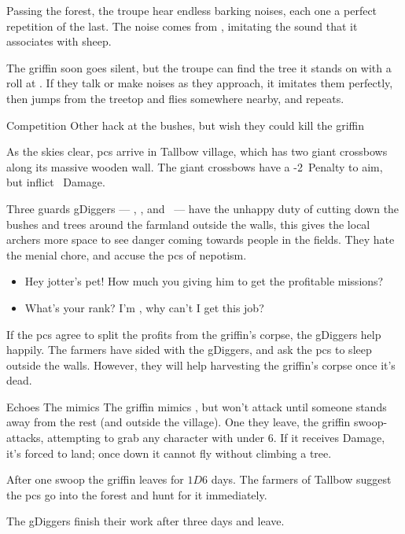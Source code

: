 \documentclass[10pt,twoside]{book}
\begin{document}
Passing the forest, the troupe hear endless barking noises, each one a perfect repetition of the last.
The noise comes from , imitating the sound that it associates with sheep.

The \gls{griffin} soon goes silent, but the troupe can find the tree it stands on with a  roll at \tn[8].
If they talk or make noises as they approach, it imitates them perfectly, then jumps from the treetop and flies somewhere nearby, and repeats.

{Competition}%
{Other  hack at the bushes, but wish they could kill the \gls{griffin}}%

As the skies clear, \glspl{pc} arrive in Tallbow \gls{village}, which has two giant \glspl{crossbow} along its massive wooden wall.
The giant \glspl{crossbow} have a -2~Penalty to aim, but inflict ~Damage.

Three \glspl{guard} \glspl{gDigger} --- \composeHumanName, \composeHumanName, and \composeHumanName\ --- have the unhappy duty of cutting down the bushes and trees around the farmland outside the walls, this gives the local archers more space to see danger coming towards people in the fields.
They hate the menial chore, and accuse the \glspl{pc} of nepotism.

\begin{itemize}\it
  \item
  Hey \gls{jotter}'s pet!
  How much you giving him to get the profitable missions?
  \item
  What's your rank?
  I'm , why can't I get this job?
\end{itemize}

If the \glspl{pc} agree to split the profits from the \gls{griffin}'s corpse, the \glspl{gDigger} help happily.
The farmers have sided with the \glspl{gDigger}, and ask the \glspl{pc} to sleep outside the walls.
However, they will help \gls{harvesting} the \gls{griffin}'s corpse once it's dead.


{Echoes}%
{The  mimics }%
The \gls{griffin} mimics , but won't attack until someone stands away from the rest (and outside the \gls{village}).
One they leave, the \gls{griffin} swoop-attacks, attempting to grab any character with  under 6.
If it receives Damage, it's forced to land; once down it cannot fly without climbing a tree.

After one swoop the \gls{griffin} leaves for $1D6$ days.
The farmers of Tallbow suggest the \glspl{pc} go into the forest and hunt for it immediately.

The \glspl{gDigger} finish their work after three days and leave.
\end{document}
